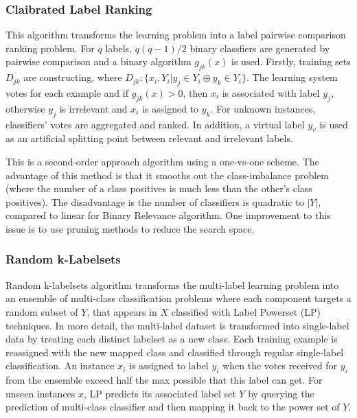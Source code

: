 \documentclass[12pt]{report}
\begin{document}
	\subsubsection*{Claibrated Label Ranking}
	This algorithm transforms the learning problem into a label pairwise comparison ranking problem. For $q$ labels, $q(q-1)/2$ binary classfiers are generated by pairwise comparison and a binary algorithm $g_{jk}(x)$ is used. Firstly, training sets $D_{jk}$ are constructing, where $D_{jk}: \{x_i, Y_i | y_j \in Y_i \oplus y_k \in Y_i\}$. The learning system votes for each example and if $g_{jk}(x)>0$, then $x_i$ is associated with label $y_j$, otherwise $y_j$ is irrelevant and $x_i$ is assigned to $y_k$. For unknown instances, classifiers' votes are aggregated and ranked. In addition, a virtual label $y_v$ is used as an artificial splitting point between relevant and irrelevant labels.
	
	This is a second-order approach algorithm using a one-vs-one scheme. The advantage of this method is that it smooths out the class-imbalance problem (where the number of a class positives is much less than the other's class positives). The disadvantage is the number of classifiers is quadratic to $|Y|$, compared to linear for Binary Relevance algorithm. One improvement to this issue is to use pruning methods to reduce the search space.
	
	\subsubsection*{Random k-Labelsets}
	Random k-labelsets algorithm transforms the multi-label learning problem into an ensemble of multi-class classification problems where each component targets a random subset of $Y$, that appears in $X$ classified with Label Powerset (LP) techniques. In more detail, the multi-label dataset is transformed into single-label data by treating each distinct labelset as a new class. Each training example is reassigned with the new mapped class and classified through regular single-label classification. An instance $x_i$ is assigned to label $y_i$ when the votes received for $y_i$ from the ensemble exceed half the max possible that this label can get. For unseen instances $x$, LP predicts its associated label set $Y$ by querying the prediction of multi-class classifier and then mapping it back to the power set of $Y$.
	
\end{document}
